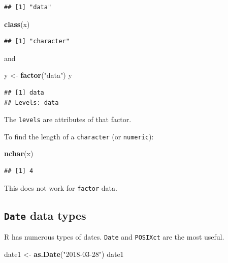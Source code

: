 \documentclass[]{book}
\newenvironment{Shaded}{\begin{snugshade}}{\end{snugshade}}
\newcommand{\KeywordTok}[1]{\textcolor[rgb]{0.13,0.29,0.53}{\textbf{#1}}}
\newcommand{\NormalTok}[1]{#1}
\newcommand{\StringTok}[1]{\textcolor[rgb]{0.31,0.60,0.02}{#1}}
\theoremstyle{definition}
\theoremstyle{definition}
\theoremstyle{definition}
\theoremstyle{remark}
\begin{document}
\begin{verbatim}
## [1] "data"
\end{verbatim}

\begin{Shaded}
\begin{Highlighting}[]
\KeywordTok{class}\NormalTok{(x)}
\end{Highlighting}
\end{Shaded}

\begin{verbatim}
## [1] "character"
\end{verbatim}

and

\begin{Shaded}
\begin{Highlighting}[]
\NormalTok{y <-}\StringTok{ }\KeywordTok{factor}\NormalTok{(}\StringTok{"data"}\NormalTok{)}
\NormalTok{y}
\end{Highlighting}
\end{Shaded}

\begin{verbatim}
## [1] data
## Levels: data
\end{verbatim}

The \texttt{levels} are attributes of that factor.

To find the length of a \texttt{character} (or \texttt{numeric}):

\begin{Shaded}
\begin{Highlighting}[]
\KeywordTok{nchar}\NormalTok{(x)}
\end{Highlighting}
\end{Shaded}

\begin{verbatim}
## [1] 4
\end{verbatim}

This does not work for \texttt{factor} data.

\hypertarget{date-data-types}{%
\subsection{\texorpdfstring{\texttt{Date} data
types}{Date data types}}\label{date-data-types}}

R has numerous types of dates. \texttt{Date} and \texttt{POSIXct} are
the most useful.

\begin{Shaded}
\begin{Highlighting}[]
\NormalTok{date1 <-}\StringTok{ }\KeywordTok{as.Date}\NormalTok{(}\StringTok{"2018-03-28"}\NormalTok{)}
\NormalTok{date1}
\end{Highlighting}
\end{Shaded}
\end{document}
